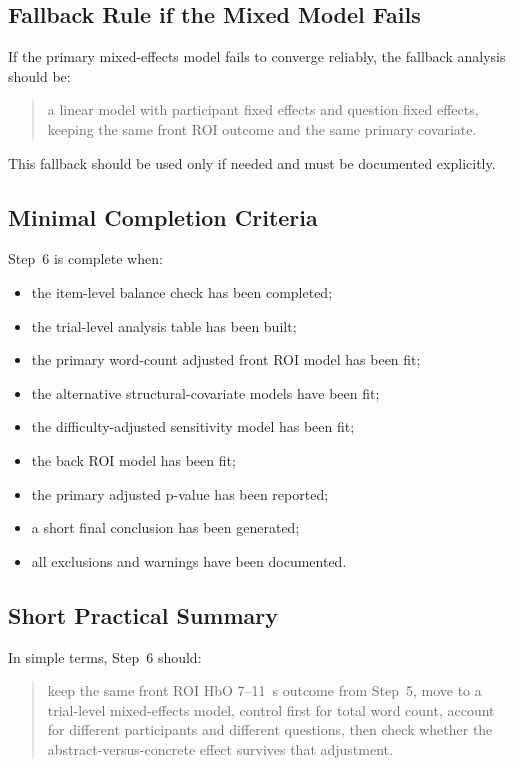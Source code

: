 \documentclass[11pt]{article}
\begin{document}
\subsection{Fallback Rule if the Mixed Model Fails}
If the primary mixed-effects model fails to converge reliably, the fallback analysis should be:
\begin{quote}
a linear model with participant fixed effects and question fixed effects, keeping the same
front ROI outcome and the same primary covariate.
\end{quote}

This fallback should be used only if needed and must be documented explicitly.

\subsection{Minimal Completion Criteria}
Step~6 is complete when:
\begin{itemize}
    \item the item-level balance check has been completed;
    \item the trial-level analysis table has been built;
    \item the primary word-count adjusted front ROI model has been fit;
    \item the alternative structural-covariate models have been fit;
    \item the difficulty-adjusted sensitivity model has been fit;
    \item the back ROI model has been fit;
    \item the primary adjusted p-value has been reported;
    \item a short final conclusion has been generated;
    \item all exclusions and warnings have been documented.
\end{itemize}

\subsection{Short Practical Summary}
In simple terms, Step~6 should:
\begin{quote}
keep the same front ROI HbO 7--11~s outcome from Step~5, move to a trial-level mixed-effects model,
control first for total word count, account for different participants and different questions,
then check whether the abstract-versus-concrete effect survives that adjustment.
\end{quote}
\end{document}
